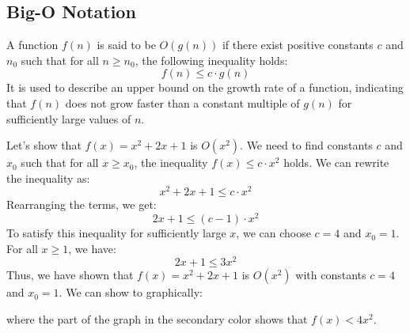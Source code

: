 \subsection{Big-O Notation}
\begin{definition}
    A function $f(n)$ is said to be $O(g(n))$ if there exist positive constants $c$ and $n_0$ such that for all $n \geq n_0$, the following inequality holds:
    \[f(n) \leq c \cdot g(n)\]
    It is used to describe an upper bound on the growth rate of a function, indicating that $f(n)$ does not grow faster than a constant multiple of $g(n)$ for sufficiently large values of $n$.
\end{definition}
\begin{eg}
    Let's show that $f(x) = x^2 + 2x + 1$ is $O(x^2)$. We need to find constants $c$ and $x_0$ such that for all $x \geq x_0$, the inequality $f(x) \leq c \cdot x^2$ holds. We can rewrite the inequality as:
    \[x^2 + 2x + 1 \leq c \cdot x^2\]
    Rearranging the terms, we get:
    \[2x + 1 \leq (c - 1) \cdot x^2\]
    To satisfy this inequality for sufficiently large $x$, we can choose $c = 4$ and $x_0 = 1$. For all $x \geq 1$, we have:
    \[2x + 1 \leq 3x^2\]
    Thus, we have shown that $f(x) = x^2 + 2x + 1$ is $O(x^2)$ with constants $c = 4$ and $x_0 = 1$. We can show to graphically:
    \begin{center}
    \end{center}
    where the part of the graph in the \textcolor{secondary}{secondary} color shows that $f(x) < 4x^2$.
\end{eg}
